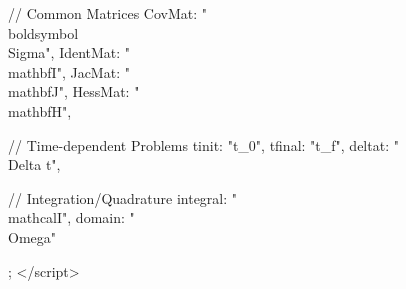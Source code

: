 {{{      // Common Matrices
      CovMat: "{\\boldsymbol{\\Sigma}}",
      IdentMat: "{\\mathbf{I}}",
      JacMat: "{\\mathbf{J}}",
      HessMat: "{\\mathbf{H}}",

      // Time-dependent Problems
      tinit: "{t_0}",
      tfinal: "{t_f}",
      deltat: "{\\Delta t}",

      // Integration/Quadrature
      integral: "{\\mathcal{I}}",
      domain: "{\\Omega}"
    }
  }
};
</script>
